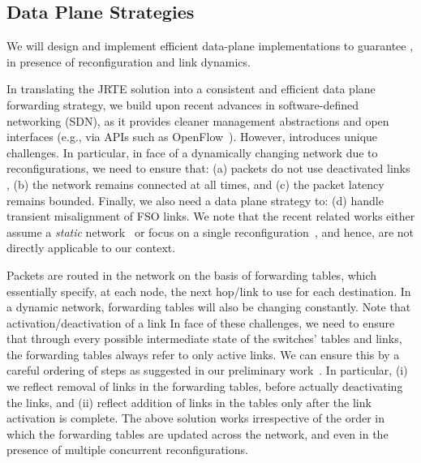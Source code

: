 \subsection{Data Plane Strategies}

\begin{task}
\label{task:system:dataplane}
We will design and implement efficient data-plane implementations to
guarantee , in presence
of reconfiguration and link dynamics.
\end{task}

\smallskip

In translating the JRTE solution into a consistent and efficient data
plane forwarding strategy, we build upon recent advances in
software-defined networking (SDN), as it provides cleaner management
abstractions and open interfaces (e.g., via APIs such as
OpenFlow~\cite{}). However, \ArchName introduces unique challenges.
In particular, in face of a dynamically changing network due to
reconfigurations, we need to ensure that: (a) packets do not use
deactivated links , (b)
the network remains connected at all times, and (c) the packet latency
remains bounded. Finally, we also need a data plane strategy to: (d)
handle transient misalignment of FSO links. We note that the recent
related works either assume a {\em static}
network~\cite{cons-update,incconsupdate} or focus on a single
reconfiguration~\cite{cu-1}, and hence, are not directly applicable to
our context.

  Packets are routed in the network on the basis of
forwarding tables, which essentially specify, at each node, the next
hop/link to use for each destination. In a dynamic network, forwarding
tables will also be changing constantly.  Note that
activation/deactivation of a link 
%
In face of these challenges, we need to ensure that through every
possible intermediate state of the switches' tables and links, the
forwarding tables always refer to only active links. We can ensure
this by a careful ordering of steps as suggested in our preliminary
work~\cite{hotnets}. In particular, (i) we reflect removal of links in
the forwarding tables, before actually deactivating the links, and
(ii) reflect addition of links in the tables only after the link
activation is complete. The above solution works irrespective of the
order in which the forwarding tables are updated across the network,
and even in the presence of multiple concurrent reconfigurations. 

